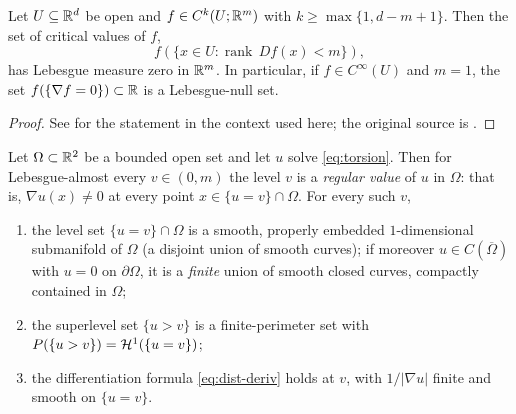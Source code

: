 \begin{theorem}[Sard]\label{thm:sard}
Let $U\subseteq\mathbb{R}^d$ be open and $f\in C^k(U;\mathbb{R}^m)$ with
$k\ge\max\{1, d-m+1\}$.  Then the set of critical values of $f$,
\[
  f\!\left(\bigl\{x\in U: \operatorname{rank}\,Df(x) < m\bigr\}\right),
\]
has Lebesgue measure zero in $\mathbb{R}^m$.  In particular, if $f\in C^\infty(U)$
and $m=1$, the set $f(\{\nabla f=0\})\subset\mathbb{R}$ is a Lebesgue-null set.
\end{theorem}

\begin{proof}
See \cite[Theorem~A.6]{Maggi2012} for the statement in the context used here;
the original source is \cite{Sard1942}.
\end{proof}

\begin{lemma}\label{lem:regular-values}
Let $\Omega\subset\mathbb{R}^2$ be a bounded open set and let $u$ solve
\eqref{eq:torsion}.  Then for Lebesgue-almost every $v\in(0,m)$ the level $v$
is a \emph{regular value} of $u$ in $\Omega$: that is, $\nabla u(x)\ne 0$ at
every point $x\in\{u=v\}\cap\Omega$.  For every such $v$,
\begin{enumerate}[label=(\roman*)]
  \item\label{it:rv-manifold}
    the level set $\{u=v\}\cap\Omega$ is a smooth, properly embedded
    $1$-dimensional submanifold of $\Omega$ (a disjoint union of smooth
    curves); if moreover $u\in C(\overline\Omega)$ with $u=0$ on
    $\partial\Omega$, it is a \emph{finite} union of smooth closed curves,
    compactly contained in $\Omega$;
  \item\label{it:rv-perimeter}
    the superlevel set $\{u>v\}$ is a finite-perimeter set with
    $P(\{u>v\}) = \mathcal{H}^1(\{u=v\})$;
  \item\label{it:rv-formula}
    the differentiation formula \eqref{eq:dist-deriv} holds at $v$, with
    $1/|\nabla u|$ finite and smooth on $\{u=v\}$.
\end{enumerate}
\end{lemma}


